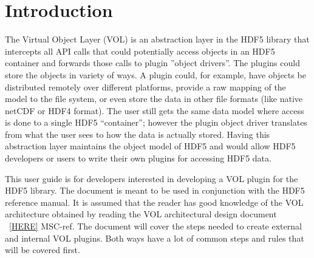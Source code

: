 

\section{Introduction}
The Virtual Object Layer (VOL) is an abstraction layer in the HDF5
library that intercepts all API calls that could potentially access
objects in an HDF5 container and forwards those calls to plugin
''object drivers''. The plugins could store the objects in variety of
ways. A plugin could, for example, have objects be distributed
remotely over different platforms, provide a raw mapping of the model
to the file system, or even store the data in other file formats (like
native netCDF or HDF4 format). The user still gets the same data model
where access is done to a single HDF5 “container”; however the plugin
object driver translates from what the user sees to how the data is
actually stored. Having this abstraction layer maintains the object
model of HDF5 and would allow HDF5 developers or users to write their
own plugins for accessing HDF5 data.

This user guide is for developers interested in developing a VOL
plugin for the HDF5 library. The document is meant to be used in
conjunction with the HDF5 reference manual. It is assumed that the
reader has good knowledge of the VOL architecture obtained by reading
the VOL architectural design document ~\ref{HERE} MSC-ref. The
document will cover the steps needed to create external and internal
VOL plugins. Both ways have a lot of common steps and rules that will
be covered first.
